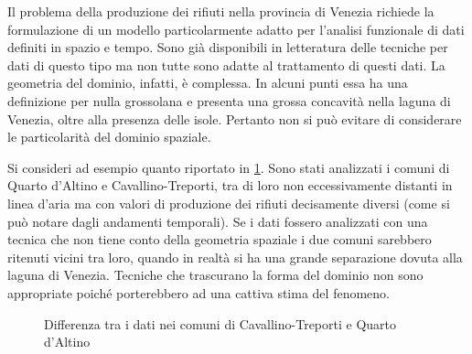 \documentclass[a4paper,11pt,twoside,openright]{book}							%
\begin{document}
Il problema della produzione dei rifiuti nella provincia di Venezia richiede la formulazione di un modello particolarmente adatto per l'analisi funzionale di dati definiti in spazio e tempo. Sono già disponibili in letteratura delle tecniche per dati di questo tipo ma non tutte sono adatte al trattamento di questi dati. La geometria del dominio, infatti, è complessa. In alcuni punti essa ha una definizione per nulla grossolana e presenta una grossa concavità nella laguna di Venezia, oltre alla presenza delle isole. Pertanto non si può evitare di considerare le particolarità del dominio spaziale.

Si consideri ad esempio quanto riportato in \ref{fig:intro3}. Sono stati analizzati i comuni di Quarto d'Altino e Cavallino-Treporti, tra di loro non eccessivamente distanti in linea d'aria ma con valori di produzione dei rifiuti decisamente diversi (come si può notare dagli andamenti temporali). Se i dati fossero analizzati con una tecnica che non tiene conto della geometria spaziale i due comuni sarebbero ritenuti vicini tra loro, quando in realtà si ha una grande separazione dovuta alla laguna di Venezia. Tecniche che trascurano la forma del dominio non sono appropriate poiché porterebbero ad una cattiva stima del fenomeno.
\newpage
\begin{figure}[t]
	\centering
	\caption{Differenza tra i dati nei comuni di Cavallino-Treporti e Quarto d'Altino}
	\label{fig:intro3}
\end{figure}
\end{document}

